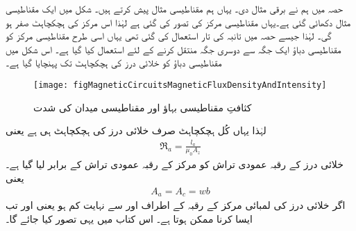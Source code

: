 حصہ  میں ہم نے برقی مثال دی۔ یہاں ہم مقناطیسی مثال پیش  کرتے ہیں۔ شکل  میں ایک مقناطیسی مثال دکھائی گئی ہے۔یہاں مقناطیسی مرکز کی  تصور کی گئی ہے لہٰذا اس مرکز کی ہچکچاہٹ  صفر ہو گی۔ لہٰذا جیسے حصہ  میں تانبہ کی تار استعمال کی گئی تھی یہاں اسی طرح مقناطیسی مرکز کو مقناطیسی دباؤ  ایک جگہ سے دوسری جگہ منتقل کرنے کے لئے استعمال کیا گیا ہے۔ اس شکل میں مقناطیسی دباؤ کو خلائی درز کی ہچکچاہٹ  تک پہنچایا گیا ہے۔
\begin{figure}
\centering
\texttt{[image: figMagneticCircuitsMagneticFluxDensityAndIntensity]}
\caption{کثافتِ مقناطیسی بہاؤ اور مقناطیسی میدان کی شدت}
\label{شکل_مقناطیسی__کثافت_مقناطیسی_بہاو_اور_شدت}
\end{figure}

لہٰذا یہاں کُل ہچکچاہٹ صرف خلائی درز کی ہچکچاہٹ ہی ہے یعنی
\begin{align}
\Re_a=\frac{l_a}{\mu_0 A_z}
\end{align}
خلائی درز کے رقبہ عمودی تراش  کو مرکز کے رقبہ عمودی تراش  کے برابر لیا گیا ہے۔ یعنی 
\begin{align}
A_a=A_c=w b
\end{align}
اگر خلائی درز کی لمبائی  مرکز کے رقبہ کے اطراف  اور  سے نہایت کم ہو یعنی  اور  تب ایسا کرنا ممکن ہوتا ہے۔ اس کتاب میں یہی تصور کیا جائے گا۔

